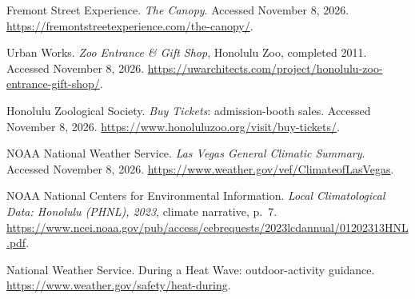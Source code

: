 Fremont Street Experience. \emph{The Canopy}. Accessed November 8, 2026.
\url{https://fremontstreetexperience.com/the-canopy/}.

Urban Works. \emph{Zoo Entrance \& Gift Shop}, Honolulu Zoo, completed 2011.
Accessed November 8, 2026.
\url{https://uwarchitects.com/project/honolulu-zoo-entrance-gift-shop/}.

Honolulu Zoological Society. \emph{Buy Tickets}: admission-booth sales.
Accessed November 8, 2026.
\url{https://www.honoluluzoo.org/visit/buy-tickets/}.

NOAA National Weather Service. \emph{Las Vegas General Climatic Summary}.
Accessed November 8, 2026.
\url{https://www.weather.gov/vef/ClimateofLasVegas}.

NOAA National Centers for Environmental Information.
\emph{Local Climatological Data: Honolulu (PHNL), 2023}, climate narrative, p.~7.
\url{https://www.ncei.noaa.gov/pub/access/cebrequests/2023lcdannual/01202313HNL.pdf}.

National Weather Service. During a Heat Wave: outdoor-activity guidance.
\url{https://www.weather.gov/safety/heat-during}.



